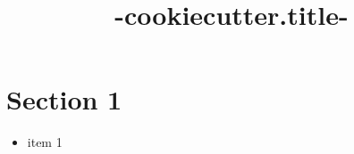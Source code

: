 \documentclass{refcard}
\title{ {{-cookiecutter.title-}} }
\begin{document}
\maketitle

\section{Section 1}

\begin{itemize}
    \item item 1
\end{itemize}
\end{document}
